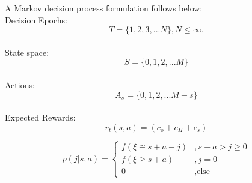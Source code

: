 \documentclass[10pt,a4paper,oneside]{report}
\begin{document}
A Markov decision process formulation follows below:\\
\noindent Decision Epochs:\\
\begin{equation*}T = \lbrace 1,2,3,...N \rbrace,   N \leq \infty. 
\end{equation*}\\
\noindent State space:\\
\begin{equation*}S = \lbrace 0,1,2,...M \rbrace  
\end{equation*}\\
\noindent Actions:\\
\begin{equation*}A_s  = \lbrace0,1,2,...M-s \rbrace
\end{equation*}\\
\noindent Expected Rewards:\\
\begin{equation*}r_t(s,a) = (c_o+c_H+c_s) 
\end{equation*}


\begin{equation*}
p(j|s,a)=
\begin{cases}
f(\xi\cong s+a-j)&,{s+a}>j\geq0\\
f(\xi\geq s+a)&,j=0\\
0&,\text{else}
\end{cases}
\end{equation*}
\end{document}

